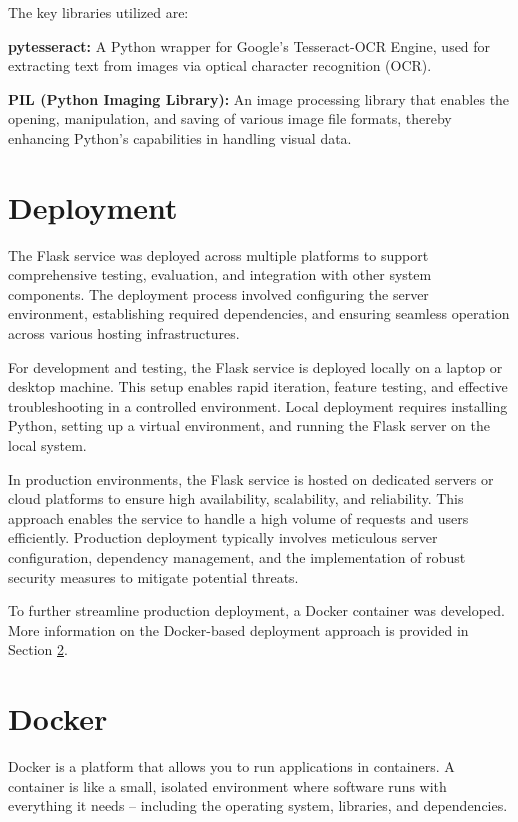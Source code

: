 The key libraries utilized are:

\textbf{pytesseract:} A Python wrapper for Google's Tesseract-OCR Engine, used for extracting text from images via optical character recognition (OCR).

\textbf{PIL (Python Imaging Library):} An image processing library that enables the opening, manipulation, and saving of various image file formats, thereby enhancing Python's capabilities in handling visual data.

\section{Deployment}

The Flask service was deployed across multiple platforms to support comprehensive testing, evaluation, and integration with other system components. The deployment process involved configuring the server environment, establishing required dependencies, and ensuring seamless operation across various hosting infrastructures.

For development and testing, the Flask service is deployed locally on a laptop or desktop machine. This setup enables rapid iteration, feature testing, and effective troubleshooting in a controlled environment. Local deployment requires installing Python, setting up a virtual environment, and running the Flask server on the local system.

In production environments, the Flask service is hosted on dedicated servers or cloud platforms to ensure high availability, scalability, and reliability. This approach enables the service to handle a high volume of requests and users efficiently. Production deployment typically involves meticulous server configuration, dependency management, and the implementation of robust security measures to mitigate potential threats.

To further streamline production deployment, a Docker container was developed. More information on the Docker-based deployment approach is provided in Section \ref{sec:docker}.

\section{Docker}
\label{sec:docker}
Docker is a platform that allows you to run applications in containers. A container is like a small, isolated environment where software runs with everything it needs – including the operating system, libraries, and dependencies.

